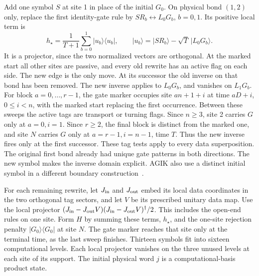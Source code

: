 \documentclass[11pt]{article}
\newcommand{\ket}[1]{\lvert #1\rangle}
\newcommand{\bra}[1]{\langle #1\rvert}
\begin{document}
Add one symbol \(S\) at site 1 in place of the initial \(G_0\). On physical bond \((1,2)\) only, replace the first identity-gate rule by \(S R_b\leftrightarrow L_0G_b\), \(b=0,1\). Its positive local term is
\[
 h_\star=\frac1{T+1}\sum_{b=0}^1 \ket{u_b}\bra{u_b},\qquad
 \ket{u_b}=\ket{S R_b}-\sqrt T\,\ket{L_0G_b}.
\]
It is a projector, since the two normalized vectors are orthogonal. At the marked start all other sites are passive, and every old rewrite has an active flag on each side. The new edge is the only move. At its successor the old inverse on that bond has been removed. The new inverse applies to \(L_0G_b\), and vanishes on \(L_1G_b\). For block \(a=0,\ldots,r-1\), the gate marker occupies site \(an+1+i\) at time \(aD+i\), \(0\le i<n\), with the marked start replacing the first occurrence. Between these sweeps the active tags are transport or turning flags. Since \(n\ge3\), site 2 carries \(G\) only at \(a=0,i=1\). Since \(r\ge2\), the final block is distinct from the marked one, and site \(N\) carries \(G\) only at \(a=r-1,i=n-1\), time \(T\). Thus the new inverse fires only at the first successor. These tag tests apply to every data superposition. The original first bond already had unique gate patterns in both directions. The new symbol makes the inverse domain explicit. AGIK also use a distinct initial symbol in a different boundary construction~\cite[Sec.~4]{agik}.

For each remaining rewrite, let \(J_{\rm in}\) and \(J_{\rm out}\) embed its local data coordinates in the two orthogonal tag sectors, and let \(V\) be its prescribed unitary data map. Use the local projector
\((J_{\rm in}-J_{\rm out}V)(J_{\rm in}-J_{\rm out}V)^\dagger/2\).
This includes the open-end rules on one site. Form \(H\) by summing these terms, \(h_\star\), and the one-site rejection penalty \(\ket{G_0}\bra{G_0}\) at site \(N\). The gate marker reaches that site only at the terminal time, as the last sweep finishes. Thirteen symbols fit into sixteen computational levels. Each local projector vanishes on the three unused levels at each site of its support. The initial physical word \(j\) is a computational-basis product state.
\end{document}
